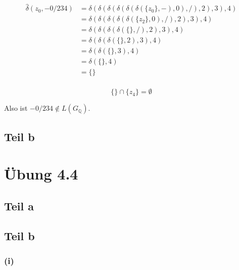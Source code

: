 \documentclass[10pt,a4paper]{article}
\begin{document}
\begin{align*}
  \hat{\delta}(z_{0}, -0/234) & = \delta(\delta(\delta(\delta(\delta(\delta(\{ z_{0} \}, -), 0), /), 2), 3), 4)\\
  & = \delta(\delta(\delta(\delta(\delta(\{ z_{2} \}, 0), /), 2), 3), 4)\\
  & = \delta(\delta(\delta(\delta(\{  \}, /), 2), 3), 4)\\
  & = \delta(\delta(\delta(\{  \}, 2), 3), 4)\\
  & = \delta(\delta(\{  \}, 3), 4)\\
  & = \delta(\{  \}, 4)\\
  & = \{  \}\\
\end{align*}

\begin{equation}
  \{  \} \cap \{ z_{4} \} = \emptyset
\end{equation}

Also ist $-0/234 \not\in L(G_{\mathbb{Q}})$.

\subsection{Teil b}

\section{Übung 4.4}

\subsection{Teil a}

\subsection{Teil b}

\subsubsection{(i)}
\end{document}
